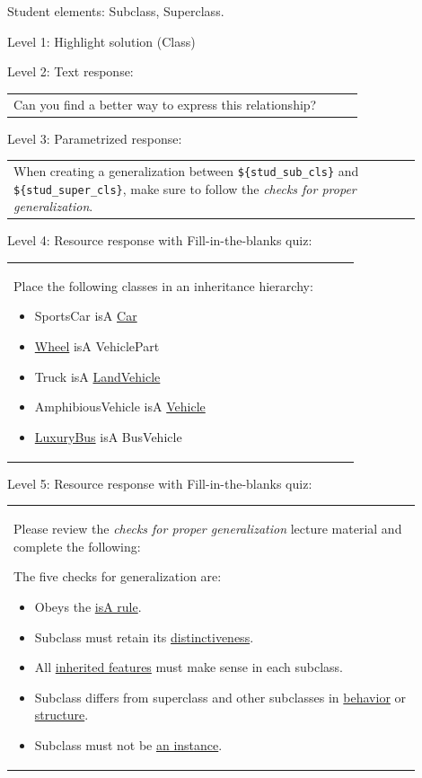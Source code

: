 Student elements: Subclass, Superclass.  \medskip

\noindent Level 1: Highlight solution (Class) \medskip

\noindent Level 2: Text response: \medskip

\begin{tabular}{|p{0.9\linewidth}}
Can you find a better way to express this relationship?
\end{tabular} \medskip

\noindent Level 3: Parametrized response: \medskip

\begin{tabular}{|p{0.9\linewidth}}
When creating a generalization between \verb|${stud_sub_cls}| and \verb|${stud_super_cls}|, make sure to follow the \textit{checks for proper generalization}.
\end{tabular} \medskip

\noindent Level 4: Resource response with Fill-in-the-blanks quiz: \medskip

\begin{tabular}{|p{0.9\linewidth}}

Place the following classes in an inheritance hierarchy:

\begin{itemize}
    \item SportsCar isA \underline{Car}
    \item \underline{Wheel} isA VehiclePart
    \item Truck isA \underline{LandVehicle}
    \item AmphibiousVehicle isA \underline{Vehicle}
    \item \underline{LuxuryBus} isA BusVehicle
\end{itemize}

\end{tabular} \medskip

\noindent Level 5: Resource response with Fill-in-the-blanks quiz: \medskip

\begin{tabular}{|p{0.9\linewidth}}

Please review the \textit{checks for proper generalization} lecture material
and complete the following:

The five checks for generalization are:

\begin{itemize}
    \item Obeys the \underline{isA rule}.
    \item Subclass must retain its \underline{distinctiveness}.
    \item All \underline{inherited features} must make sense in each subclass.
    \item Subclass differs from superclass and other subclasses in \underline{behavior} or \underline{structure}.
    \item Subclass must not be \underline{an instance}.
\end{itemize}

\end{tabular} \medskip

